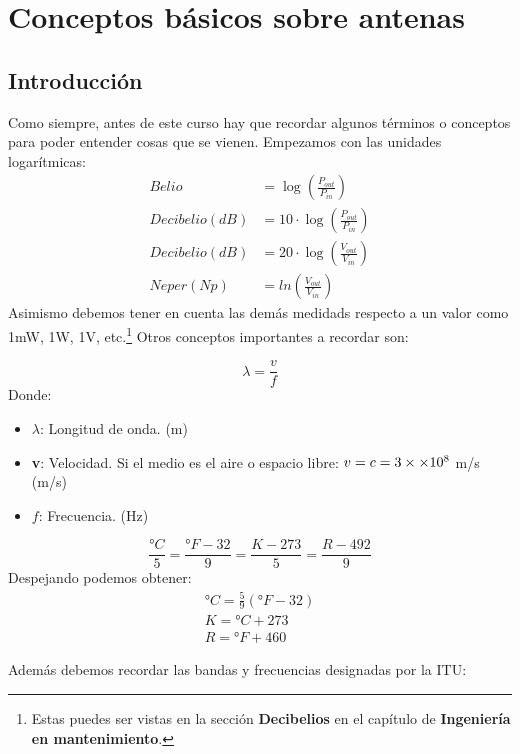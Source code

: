 \documentclass[
	12pt, %
	fleqn, %
	a4paper, %
	oneside, %
]{LegrandOrangeBook}
\begin{document}
\chapter{Conceptos básicos sobre antenas}
\section{Introducción}
Como siempre, antes de este curso hay que recordar algunos términos o conceptos para poder entender cosas que se vienen. Empezamos con las unidades logarítmicas:
\begin{align*}
Belio&=\log\left(\frac{P_{out}}{P_{in}}\right)\\
Decibelio(dB)&=10\cdot\log\left(\frac{P_{out}}{P_{in}}\right)\\
Decibelio(dB)&=20\cdot\log\left(\frac{V_{out}}{V_{in}}\right)\\
Neper(Np)&=ln\left(\frac{V_{out}}{V_{in}}\right)
\end{align*}
Asimismo debemos tener en cuenta las demás medidads respecto a un valor como 1mW, 1W, 1V, etc.\footnote{Estas puedes ser vistas en la sección \textbf{Decibelios} en el capítulo de \textbf{Ingeniería en mantenimiento}.}
Otros conceptos importantes a recordar son:
\begin{definition}
\begin{equation}
\lambda=\frac{v}{f}
\label{eq:longitud de onda}
\end{equation}
Donde:
\begin{itemize}
\item $\lambda$: Longitud de onda. (m)
\item \textbf{v}: Velocidad. Si el medio es el aire o espacio libre: $v=c=3\times\times 10^{8}$ m/s (m/s)
\item $f$: Frecuencia. (Hz)
\end{itemize}
\end{definition}
\begin{definition}[Temperatura]
\begin{equation}
\frac{°C}{5}=\frac{°F-32}{9}=\frac{K-273}{5}=\frac{R-492}{9}
\end{equation}
Despejando podemos obtener:
\begin{align*}
°C=\frac{5}{9}\left(°F-32\right)\\
K=°C+273\\
R=°F+460
\end{align*}
\end{definition}
Además debemos recordar las bandas y frecuencias designadas por la ITU:
\end{document}
